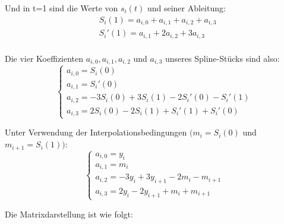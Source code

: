 {		Und in t=1 sind die Werte von \(s_i(t)\) und seiner Ableitung:
		\begin{align*}
			& S_i(1)=a_{i,0}+a_{i,1}+a_{i,2}+a_{i,3}\\
			& S_i'(1)=a_{i,1}+2a_{i,2}+3a_{i,3}\\
		\end{align*}
		
		Die vier Koeffizienten \(a_{i,0}, a_{i,1}, a_{i,2}\) und \(a_{i,3}\) unseres Spline-Stücks sind also:
		\begin{equation*}
			\begin{cases}
				a_{i,0} =S_i(0)  \\
				a_{i,1} =S_i'(0) \\
				a_{i,2} =-3S_i(0)+3S_i(1)-2S_i'(0)-S_i'(1) \\
				a_{i,3} =2S_i(0)-2S_i(1)+S_i'(1)+S_i'(0)
			\end{cases}
		\end{equation*}
		
		Unter Verwendung der Interpolationsbedingungen \((m_i=S_i(0)\) und \(m_{i+1}=S_i(1))\):
		\begin{equation*}
			\begin{cases}
				a_{i,0} =y_i \\
				a_{i,1} =m_i \\
				a_{i,2} =-3y_i+3y_{i+1}-2m_i-m_{i+1} \\
				a_{i,3} =2y_i-2y_{i+1}+m_i+m_{i+1}
			\end{cases}
		\end{equation*}
		
		
		
		\begin{frame}
			Die Matrixdarstellung ist wie folgt:
			

\end{frame}}

